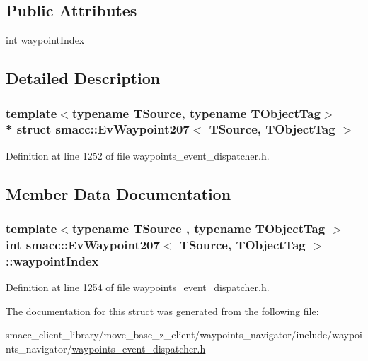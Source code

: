 \subsection*{Public Attributes}
\begin{DoxyCompactItemize}
\item 
int \hyperlink{structsmacc_1_1EvWaypoint207_adca1c8febdabeb253c622c26803f4eef}{waypoint\+Index}
\end{DoxyCompactItemize}


\subsection{Detailed Description}
\subsubsection*{template$<$typename T\+Source, typename T\+Object\+Tag$>$\\*
struct smacc\+::\+Ev\+Waypoint207$<$ T\+Source, T\+Object\+Tag $>$}



Definition at line 1252 of file waypoints\+\_\+event\+\_\+dispatcher.\+h.



\subsection{Member Data Documentation}
\subsubsection[{\texorpdfstring{waypoint\+Index}{waypointIndex}}]{\setlength{\rightskip}{0pt plus 5cm}template$<$typename T\+Source , typename T\+Object\+Tag $>$ int {\bf smacc\+::\+Ev\+Waypoint207}$<$ T\+Source, T\+Object\+Tag $>$\+::waypoint\+Index}\hypertarget{structsmacc_1_1EvWaypoint207_adca1c8febdabeb253c622c26803f4eef}{}\label{structsmacc_1_1EvWaypoint207_adca1c8febdabeb253c622c26803f4eef}


Definition at line 1254 of file waypoints\+\_\+event\+\_\+dispatcher.\+h.



The documentation for this struct was generated from the following file\+:\begin{DoxyCompactItemize}
\item 
smacc\+\_\+client\+\_\+library/move\+\_\+base\+\_\+z\+\_\+client/waypoints\+\_\+navigator/include/waypoints\+\_\+navigator/\hyperlink{waypoints__event__dispatcher_8h}{waypoints\+\_\+event\+\_\+dispatcher.\+h}\end{DoxyCompactItemize}
